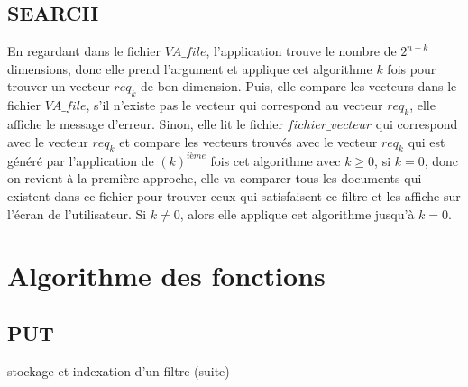 \documentclass[a4paper,12pt]{report}
\begin{document}
\subsection{SEARCH}
	En regardant dans le fichier $VA\_file$, l'application trouve le nombre de $2^{n-k}$ dimensions, donc elle prend l'argument et applique cet algorithme $k$ fois pour trouver un vecteur $req_k$ de bon dimension. Puis, elle compare les vecteurs dans le fichier $VA\_file$, s'il n'existe pas le vecteur qui correspond au vecteur $req_k$, elle affiche le message d'erreur. Sinon, elle lit le fichier $fichier\_vecteur$ qui correspond avec le vecteur $req_k$ et compare les vecteurs trouvés avec le vecteur $req_{k}$ qui est généré par l'application de $(k)^{ième}$ fois cet algorithme avec $k \geq 0$, si $k = 0$, donc on revient à la première approche, elle va comparer tous les documents qui existent dans ce fichier pour trouver ceux qui satisfaisent ce filtre et les affiche sur l'écran de l'utilisateur. Si $k \neq 0$, alors elle applique cet algorithme jusqu'à $k = 0$.

\section{Algorithme des fonctions}
\subsection{PUT}
	\begin{algorithme}
		stockage et indexation d'un filtre (suite)
	\end{algorithme}
	
\end{document}

